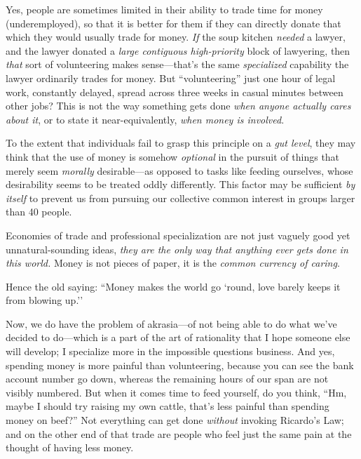 {
 Yes, people are sometimes limited in their ability to trade time
for money (underemployed), so that it is better for them if they can
directly donate that which they would usually trade for money.
\textit{If} the soup kitchen \textit{needed} a lawyer, and the lawyer
donated a \textit{large contiguous high-priority} block of lawyering,
then \textit{that} sort of volunteering makes
sense---that's the same \textit{specialized} capability
the lawyer ordinarily trades for money. But
``volunteering'' just one hour of
legal work, constantly delayed, spread across three weeks in casual
minutes between other jobs? This is not the way something gets done
\textit{when anyone actually cares about it}, or to state it
near-equivalently, \textit{when money is involved}.}

{
 To the extent that individuals fail to grasp this principle on a
\textit{gut level}, they may think that the use of money is somehow
\textit{optional} in the pursuit of things that merely seem
\textit{morally} desirable---as opposed to tasks like feeding
ourselves, whose desirability seems to be treated oddly differently.
This factor may be sufficient \textit{by itself} to prevent us from
pursuing our collective common interest in groups larger than 40
people.}

{
 Economies of trade and professional specialization are not just
vaguely good yet unnatural-sounding ideas, \textit{they are the only
way that anything ever gets done in this world.} Money is not pieces of
paper, it is the \textit{common currency of caring}.}

{
 Hence the old saying: ``Money makes the world go
`round, love barely keeps it from blowing
up.''}

{
 Now, we do have the problem of akrasia---of not being able to do
what we've decided to do---which is a part of the art
of rationality that I hope someone else will develop; I specialize more
in the impossible questions business. And yes, spending money is more
painful than volunteering, because you can see the bank account number
go down, whereas the remaining hours of our span are not visibly
numbered. But when it comes time to feed yourself, do you think,
``Hm, maybe I should try raising my own cattle,
that's less painful than spending money on
beef?'' Not everything can get done \textit{without}
invoking Ricardo's Law; and on the other end of that
trade are people who feel just the same pain at the thought of having
less money.}

